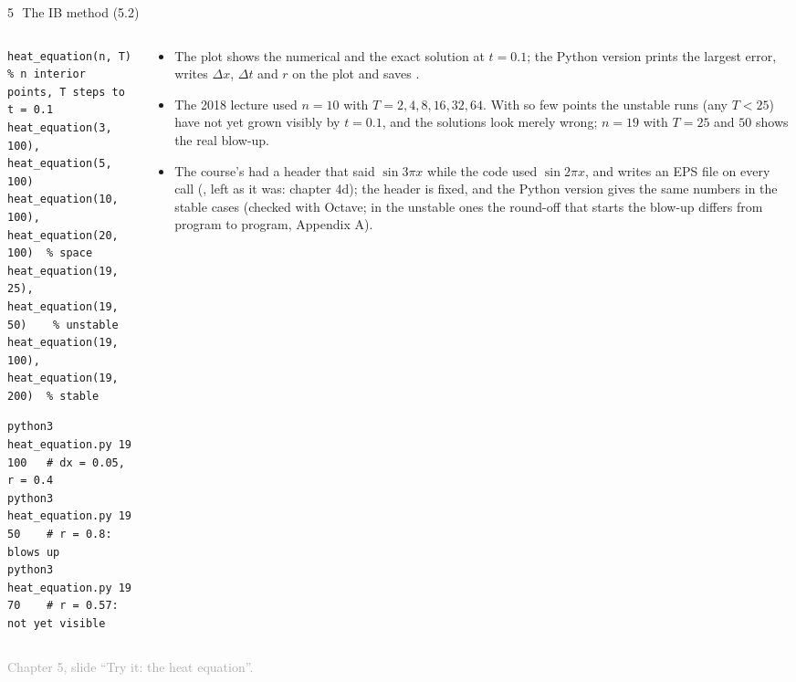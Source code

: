 \documentclass[aspectratio=169,11pt]{beamer}
\newcommand{\sourcecredit}[1]{\vfill\begin{flushright}\tiny\textcolor{DarkGray}{#1}\end{flushright}}
\begin{document}
\begin{frame}[fragile]{5\,\textbullet\ The IB method (5.2)}
\label{fr:c5x2}
\footnotesize
{}
\begin{columns}[T,onlytextwidth]
\begin{column}{0.5\textwidth}
\begin{lstlisting}[style=matlab,basicstyle=\ttfamily\tiny\color{BlackGray}]
heat_equation(n, T)   % n interior points, T steps to t = 0.1
heat_equation(3, 100), heat_equation(5, 100)
heat_equation(10, 100), heat_equation(20, 100)  % space
heat_equation(19, 25), heat_equation(19, 50)    % unstable
heat_equation(19, 100), heat_equation(19, 200)  % stable
\end{lstlisting}
\begin{lstlisting}[style=shell,basicstyle=\ttfamily\tiny\color{BlackGray}]
python3 heat_equation.py 19 100   # dx = 0.05, r = 0.4
python3 heat_equation.py 19 50    # r = 0.8: blows up
python3 heat_equation.py 19 70    # r = 0.57: not yet visible
\end{lstlisting}
\end{column}
\begin{column}{0.48\textwidth}
\scriptsize
\begin{itemize}
  \item The plot shows the numerical and the exact solution at $t = 0.1$; the Python version prints the largest error, writes $\Delta x$, $\Delta t$ and $r$ on the plot and saves .
  \item The 2018 lecture used $n = 10$ with $T = 2, 4, 8, 16, 32, 64$. With so few points the unstable runs (any $T < 25$) have not yet grown visibly by $t = 0.1$, and the solutions look merely wrong; $n = 19$ with $T = 25$ and $50$ shows the real blow-up.
  \item The course's  had a header that said $\sin 3\pi x$ while the code used $\sin 2\pi x$, and writes an EPS file on every call (, left as it was: chapter 4d); the header is fixed, and the Python version gives the same numbers in the stable cases (checked with Octave; in the unstable ones the round-off that starts the blow-up differs from program to program, Appendix A).
\end{itemize}
\end{column}
\end{columns}
\sourcecredit{Chapter 5, slide ``Try it: the heat equation''.}
\end{frame}
\end{document}
